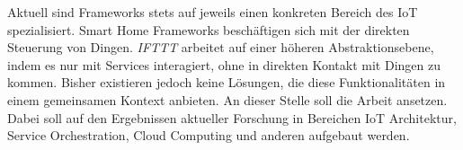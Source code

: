 \documentclass[12pt]{article}
\begin{document}
Aktuell sind Frameworks stets auf jeweils einen konkreten Bereich des IoT spezialisiert. Smart Home Frameworks beschäftigen sich mit der direkten Steuerung von Dingen. \textit{IFTTT} arbeitet auf einer höheren Abstraktionsebene, indem es nur mit Services interagiert, ohne in direkten Kontakt mit Dingen zu kommen. Bisher existieren jedoch keine Lösungen, die diese Funktionalitäten in einem gemeinsamen Kontext anbieten. An dieser Stelle soll die Arbeit ansetzen. Dabei soll auf den Ergebnissen aktueller Forschung in Bereichen IoT Architektur, Service Orchestration, Cloud Computing und anderen aufgebaut werden.











\nocite{*}

\end{document}
